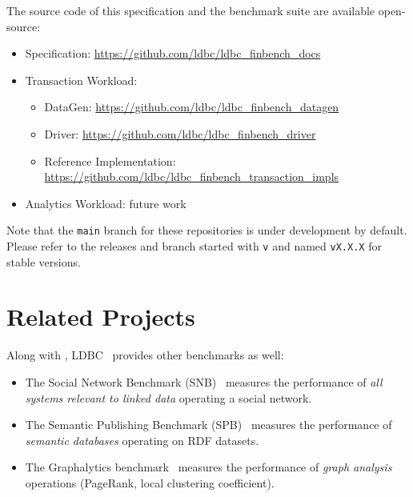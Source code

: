 The source code of this specification and the benchmark suite are available
open-source:
\begin{itemize}
    \item \ldbcfinbench Specification: \url{https://github.com/ldbc/ldbc_finbench_docs}
    \item Transaction Workload:
          \begin{itemize}
              \item \ldbcfinbench DataGen: \url{https://github.com/ldbc/ldbc_finbench_datagen}
              \item \ldbcfinbench Driver: \url{https://github.com/ldbc/ldbc_finbench_driver}
              \item \ldbcfinbench Reference Implementation: \url{https://github.com/ldbc/ldbc_finbench_transaction_impls}
          \end{itemize}
    \item Analytics Workload: future work
\end{itemize}

Note that the \texttt{main} branch for these repositories is under development
by default. Please refer to the releases and branch started with \texttt{v} and
named \texttt{vX.X.X} for stable versions.


\section{Related Projects}

Along with \ldbcfinbench, LDBC~\cite{DBLP:journals/sigmod/AnglesBLF0ENMKT14}
provides other benchmarks as well:

\begin{itemize}
    \item The Social Network Benchmark
          (SNB)~\cite{DBLP:journals/corr/abs-2001-02299} measures the
          performance of \emph{all systems relevant to linked data} operating a
          social network.
    \item The Semantic Publishing Benchmark
          (SPB)~\cite{DBLP:conf/semweb/SpasicJP16} measures the performance of
          \emph{semantic databases} operating on RDF datasets.
    \item The Graphalytics
          benchmark~\cite{DBLP:journals/pvldb/IosupHNHPMCCSAT16} measures the
          performance of \emph{graph analysis} operations (\eg PageRank, local
          clustering coefficient).
\end{itemize}